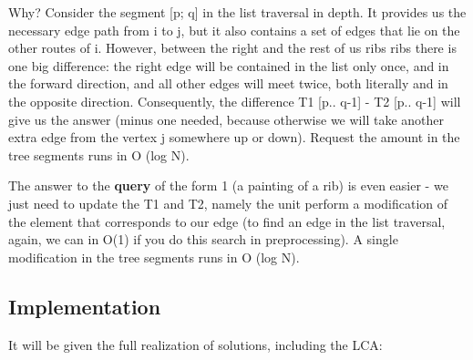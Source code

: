 Why? Consider the segment [p; q] in the list traversal in depth. It provides us the necessary edge path from i to j, but it also contains a set of edges that lie on the other routes of i. However, between the right and the rest of us ribs ribs there is one big difference: the right edge will be contained in the list only once, and in the forward direction, and all other edges will meet twice, both literally and in the opposite direction. Consequently, the difference T1 [p.. q-1] - T2 [p.. q-1] will give us the answer (minus one needed, because otherwise we will take another extra edge from the vertex j somewhere up or down). Request the amount in the tree segments runs in O (log N).

The answer to the \textbf{query} of the form 1 (a painting of a rib) is even easier - we just need to update the T1 and T2, namely the unit perform a modification of the element that corresponds to our edge (to find an edge in the list traversal, again, we can in O(1) if you do this search in preprocessing). A single modification in the tree segments runs in O (log N).

\subsection{ Implementation }
It will be given the full realization of solutions, including the LCA:

